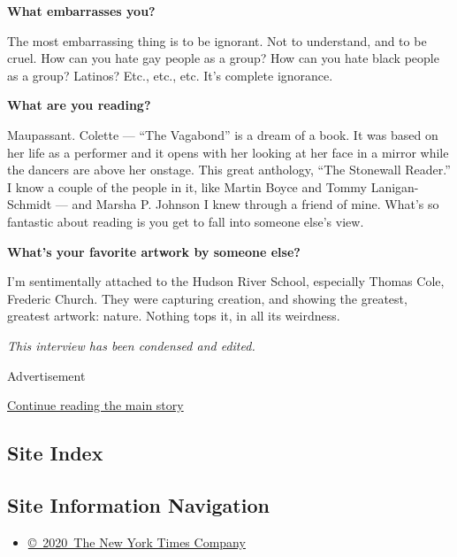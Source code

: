 \textbf{What embarrasses you?}

The most embarrassing thing is to be ignorant. Not to understand, and to
be cruel. How can you hate gay people as a group? How can you hate black
people as a group? Latinos? Etc., etc., etc. It's complete ignorance.

\textbf{What are you reading?}

Maupassant. Colette --- ``The Vagabond'' is a dream of a book. It was
based on her life as a performer and it opens with her looking at her
face in a mirror while the dancers are above her onstage. This great
anthology, ``The Stonewall Reader.'' I know a couple of the people in
it, like Martin Boyce and Tommy Lanigan-Schmidt --- and Marsha P.
Johnson I knew through a friend of mine. What's so fantastic about
reading is you get to fall into someone else's view.

\textbf{What's your favorite artwork by someone else?}

I'm sentimentally attached to the Hudson River School, especially Thomas
Cole, Frederic Church. They were capturing creation, and showing the
greatest, greatest artwork: nature. Nothing tops it, in all its
weirdness.

\emph{This interview has been condensed and edited.}

Advertisement

\protect\hyperlink{after-bottom}{Continue reading the main story}

\hypertarget{site-index}{%
\subsection{Site Index}\label{site-index}}

\hypertarget{site-information-navigation}{%
\subsection{Site Information
Navigation}\label{site-information-navigation}}

\begin{itemize}
\tightlist
\item
  \href{https://help.nytimes3xbfgragh.onion/hc/en-us/articles/115014792127-Copyright-notice}{©~2020~The
  New York Times Company}
\end{itemize}

